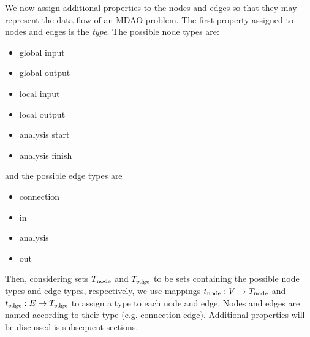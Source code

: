 We now assign additional properties to the nodes and edges so that they may represent the data flow of an MDAO problem. 
The first property assigned to nodes and edges is the \emph{type}. The possible node types are:
\begin{itemize}
\item global input
\item global output
\item local input
\item local output
\item analysis start
\item analysis finish
\end{itemize}
and the possible edge types are
\begin{itemize}
\item connection
\item in
\item analysis
\item out
\end{itemize}
Then, considering sets $T_\textrm{node}$ and $T_\textrm{edge}$ to be sets containing the possible node types and edge types, respectively, we use mappings $t_\textrm{node}:V \to T_\textrm{node}$ and $t_\textrm{edge}:E \to T_\textrm{edge}$ to assign a type to each node and edge. Nodes and edges are named according to their type (e.g. connection edge). Additional properties will be discussed is subsequent sections.

